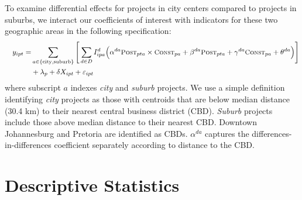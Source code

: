 \documentclass[12pt]{article}
\begin{document}
To examine differential effects for projects in city centers compared to projects in suburbs, we interact our coefficients of interest with indicators for these two geographic areas in the following specification:
\begin{align}\label{eq:main_het}
\begin{split}
\quad y_{ipt}  =&  \sum_{a\in\{\text{city},\text{suburb}\}}  \Bigg[    \sum\limits_{d\in D} I^{d}_{ipa}\Big( \alpha^{da} \textsc{\small Post}_{pta}\times\textsc{\small Const}_{pa}  +  \beta^{da}\textsc{\small Post}_{pta}  +  \gamma^{da}\textsc{\small Const}_{pa}  +  \theta^{da} \Big)  \Bigg]  \\ & +  \lambda_{p} +   \delta X_{ipt}  +  \varepsilon_{ipt} \quad 
\end{split}
\end{align}
where subscript $a$ indexes \textit{city} and \textit{suburb} projects.  We use a simple definition identifying \textit{city} projects as those with centroids that are below median distance (30.4 km) to their nearest central business district (CBD).  \textit{Suburb} projects include those above median distance to their nearest CBD.  Downtown Johannesburg and Pretoria are identified as CBDs.  $\alpha^{da}$ captures the differences-in-differences coefficient separately according to distance to the CBD.   

\section{Descriptive Statistics}\label{section:descriptives}


% 
\end{document}
